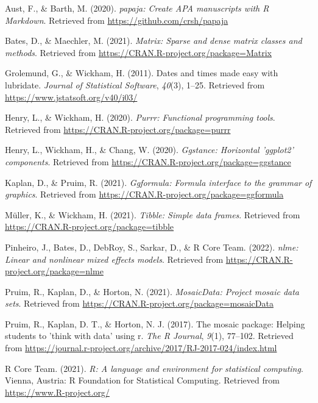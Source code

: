 \documentclass[
  english,
  man]{apa6}
\begin{document}
\hypertarget{refs}{}
\leavevmode\hypertarget{ref-R-papaja}{}%
Aust, F., \& Barth, M. (2020). \emph{papaja: Create APA manuscripts with R Markdown}. Retrieved from \url{https://github.com/crsh/papaja}

\leavevmode\hypertarget{ref-R-Matrix}{}%
Bates, D., \& Maechler, M. (2021). \emph{Matrix: Sparse and dense matrix classes and methods}. Retrieved from \url{https://CRAN.R-project.org/package=Matrix}

\leavevmode\hypertarget{ref-R-lubridate}{}%
Grolemund, G., \& Wickham, H. (2011). Dates and times made easy with lubridate. \emph{Journal of Statistical Software}, \emph{40}(3), 1--25. Retrieved from \url{https://www.jstatsoft.org/v40/i03/}

\leavevmode\hypertarget{ref-R-purrr}{}%
Henry, L., \& Wickham, H. (2020). \emph{Purrr: Functional programming tools}. Retrieved from \url{https://CRAN.R-project.org/package=purrr}

\leavevmode\hypertarget{ref-R-ggstance}{}%
Henry, L., Wickham, H., \& Chang, W. (2020). \emph{Ggstance: Horizontal 'ggplot2' components}. Retrieved from \url{https://CRAN.R-project.org/package=ggstance}

\leavevmode\hypertarget{ref-R-ggformula}{}%
Kaplan, D., \& Pruim, R. (2021). \emph{Ggformula: Formula interface to the grammar of graphics}. Retrieved from \url{https://CRAN.R-project.org/package=ggformula}

\leavevmode\hypertarget{ref-R-tibble}{}%
Müller, K., \& Wickham, H. (2021). \emph{Tibble: Simple data frames}. Retrieved from \url{https://CRAN.R-project.org/package=tibble}

\leavevmode\hypertarget{ref-R-nlme}{}%
Pinheiro, J., Bates, D., DebRoy, S., Sarkar, D., \& R Core Team. (2022). \emph{nlme: Linear and nonlinear mixed effects models}. Retrieved from \url{https://CRAN.R-project.org/package=nlme}

\leavevmode\hypertarget{ref-R-mosaicData}{}%
Pruim, R., Kaplan, D., \& Horton, N. (2021). \emph{MosaicData: Project mosaic data sets}. Retrieved from \url{https://CRAN.R-project.org/package=mosaicData}

\leavevmode\hypertarget{ref-R-mosaic}{}%
Pruim, R., Kaplan, D. T., \& Horton, N. J. (2017). The mosaic package: Helping students to 'think with data' using r. \emph{The R Journal}, \emph{9}(1), 77--102. Retrieved from \url{https://journal.r-project.org/archive/2017/RJ-2017-024/index.html}

\leavevmode\hypertarget{ref-R-base}{}%
R Core Team. (2021). \emph{R: A language and environment for statistical computing}. Vienna, Austria: R Foundation for Statistical Computing. Retrieved from \url{https://www.R-project.org/}
\end{document}

